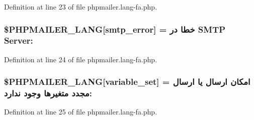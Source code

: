 Definition at line 23 of file phpmailer.\+lang-\/fa.\+php.

\subsubsection[{\texorpdfstring{\$\+P\+H\+P\+M\+A\+I\+L\+E\+R\+\_\+\+L\+A\+NG}{$PHPMAILER_LANG}}]{\setlength{\rightskip}{0pt plus 5cm}\$P\+H\+P\+M\+A\+I\+L\+E\+R\+\_\+\+L\+A\+NG\mbox{[}\textquotesingle{}smtp\+\_\+error\textquotesingle{}\mbox{]} = \textquotesingle{}خطا در {\bf S\+M\+TP} Server\+: \textquotesingle{}}\hypertarget{phpmailer_8lang-fa_8php_a7d9cffba1e669c845f8a4c891ee50064}{}\label{phpmailer_8lang-fa_8php_a7d9cffba1e669c845f8a4c891ee50064}


Definition at line 24 of file phpmailer.\+lang-\/fa.\+php.

\subsubsection[{\texorpdfstring{\$\+P\+H\+P\+M\+A\+I\+L\+E\+R\+\_\+\+L\+A\+NG}{$PHPMAILER_LANG}}]{\setlength{\rightskip}{0pt plus 5cm}\$P\+H\+P\+M\+A\+I\+L\+E\+R\+\_\+\+L\+A\+NG\mbox{[}\textquotesingle{}variable\+\_\+set\textquotesingle{}\mbox{]} = \textquotesingle{}امکان ارسال یا ارسال مجدد متغیرها وجود ندارد\+: \textquotesingle{}}\hypertarget{phpmailer_8lang-fa_8php_af795debc7a739d038742691c358d9032}{}\label{phpmailer_8lang-fa_8php_af795debc7a739d038742691c358d9032}


Definition at line 25 of file phpmailer.\+lang-\/fa.\+php.

